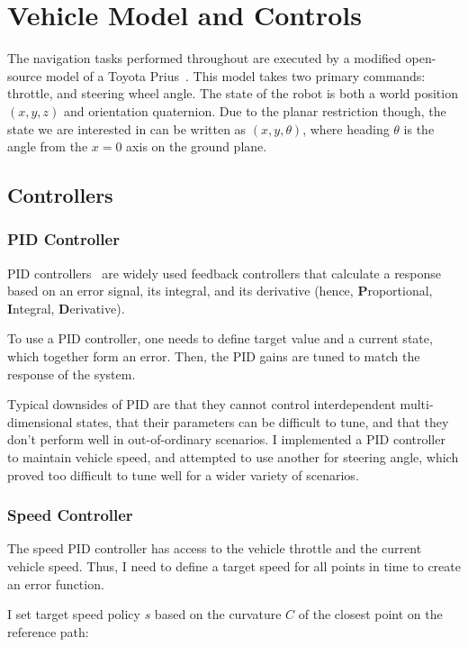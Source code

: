 \documentclass[a4paper,12pt,twoside,openright]{report}
\begin{document}
\section{Vehicle Model and Controls}
\label{sec:impl:vehicle}

The navigation tasks performed throughout are executed by a modified
open-source model of a Toyota Prius~\cite{osrfPrius}. This model
takes two primary commands: throttle, and steering wheel angle.
The state of the robot is both a world position $(x,y,z)$
and orientation quaternion. Due to the planar restriction though,
the state we are interested in can be written as
$(x,y, \theta)$, where heading $\theta$ is the angle from the $x=0$ axis 
on the ground plane.

\subsection{Controllers}

\subsubsection{PID Controller}
PID controllers~\cite{aastrom1995pid} are widely used feedback controllers
that calculate a response based on an error signal, its integral, and its derivative
(hence, \textbf{P}roportional, \textbf{I}ntegral, \textbf{D}erivative).

To use a PID controller, one needs to define target value and a current state,
which together form an error. Then, the PID gains are tuned to match
the response of the system.

Typical downsides of PID are that they cannot control interdependent
multi-dimensional states, that their parameters can be difficult to tune, and that they don't perform
well in out-of-ordinary scenarios. I implemented a PID controller to 
maintain vehicle speed, and attempted to use another for steering angle,
which proved too difficult to tune well for a wider variety of scenarios.
 
\subsubsection{Speed Controller}

The speed PID controller has access to the vehicle throttle 
and the current vehicle speed. Thus, I need to define
a target speed for all points in time to create an error function.

I set target speed policy $s$ based on the curvature $C$ of the 
closest point on the reference path:
\end{document}
